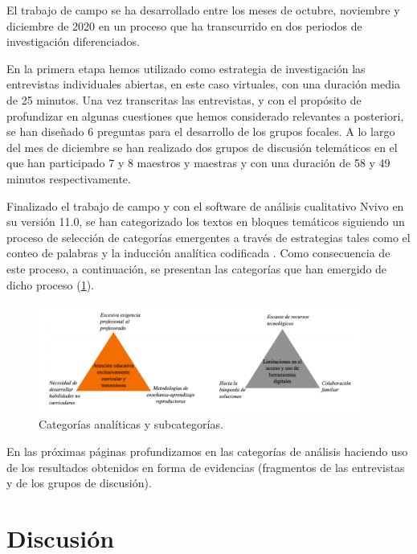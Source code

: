 \documentclass{textolivre}
\begin{document}
El trabajo de campo se ha desarrollado entre los meses de octubre, noviembre y diciembre de 2020 en un proceso que ha transcurrido en dos periodos de investigación diferenciados.

En la primera etapa hemos utilizado como estrategia de investigación las entrevistas individuales abiertas, en este caso virtuales, con una duración media de 25 minutos. Una vez transcritas las entrevistas, y con el propósito de profundizar en algunas cuestiones que hemos considerado relevantes a posteriori, se han diseñado 6 preguntas para el desarrollo de los grupos focales. A lo largo del mes de diciembre se han realizado dos grupos de discusión telemáticos en el que han participado 7 y 8 maestros y maestras y con una duración de 58 y 49 minutos respectivamente.

Finalizado el trabajo de campo y con el software de análisis cualitativo Nvivo en su versión 11.0, se han categorizado los textos en bloques temáticos siguiendo un proceso de selección de categorías emergentes a través de estrategias tales como el conteo de palabras y la inducción analítica codificada \cite{ryan2003}. %
Como consecuencia de este proceso, a continuación, se presentan las categorías que han emergido de dicho proceso (\cref{fig1}).

\begin{figure}[htbp]
 \centering
 \includegraphics[width=0.95\textwidth]{figura.png}
 \caption{Categorías analíticas y subcategorías.}
 \label{fig1}
\end{figure}

En las próximas páginas profundizamos en las categorías de análisis haciendo uso de los resultados obtenidos en forma de evidencias (fragmentos de las entrevistas y de los grupos de discusión).

\section{Discusión}
\end{document}
